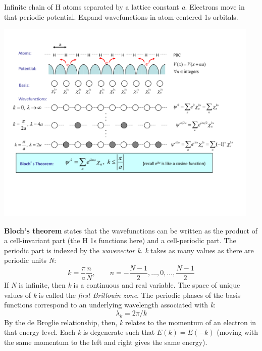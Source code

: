 \documentclass[11pt]{article}
\begin{document}
Infinite chain of H atoms separated by a lattice constant \emph{a}. Electrons move in that periodic potential. Expand wavefunctions in atom-centered 1s orbitals.
\begin{center}
\includegraphics[width=0.95\textwidth]{./Images/Hchain.pdf}
\end{center}

\textbf{Bloch’s theorem} states that the wavefunctions can be written as the product of a cell-invariant part (the H 1s functions here) and a cell-periodic part.  The periodic part is indexed by the \emph{wavevector k}.  \emph{k} takes as many values as there are periodic units \emph{N}:
\[ k = \frac{\pi}{a}\frac{n}{N},\qquad n=-\frac{N-1}{2}, \ldots, 0, \ldots, \frac{N-1}{2} \]
If \emph{N} is infinite, then \emph{k} is a continuous and real variable. The space of unique values of \emph{k} is called the \emph{first Brillouin zone}.  The periodic phases of the basis functions correspond to an underlying wavelength associated with \emph{k}:
\[\lambda_k = 2\pi/k\]
By the de Broglie relationship, then, \emph{k} relates to the momentum of an electron in that energy level.  Each \emph{k} is degenerate such that \(E(k) = E(-k)\) (moving with the same momentum to the left and right gives the same energy).
\end{document}
